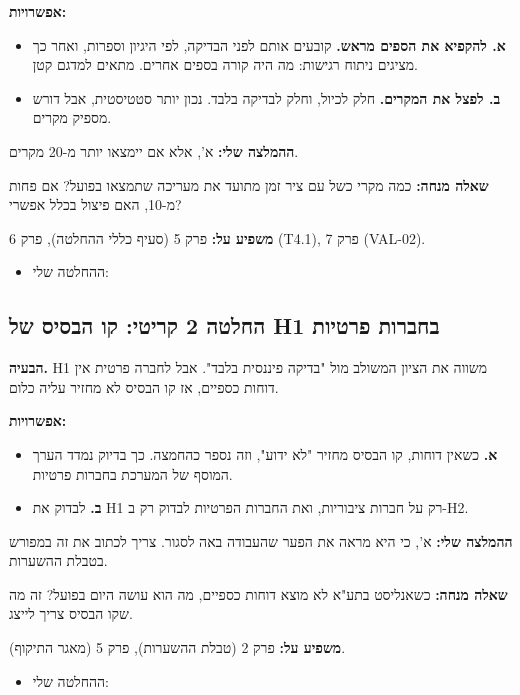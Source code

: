 \documentclass[11pt,a4paper]{article}
\newcommand{\en}[1]{\foreignlanguage{english}{#1}}
\newcommand{\cb}{\framebox[1.7ex]{\rule{0pt}{1.3ex}}}
\newenvironment{checks}{\begin{itemize}\renewcommand{\labelitemi}{\cb}}{\end{itemize}}
\newcommand{\crit}{\textcolor{red!70!black}{\textbf{קריטי}}}
\begin{document}
\textbf{אפשרויות:}
\begin{itemize}
\item \textbf{א. להקפיא את הספים מראש.} קובעים אותם לפני הבדיקה, לפי היגיון וספרות, ואחר כך מציגים ניתוח רגישות: מה היה קורה בספים אחרים. מתאים למדגם קטן.
\item \textbf{ב. לפצל את המקרים.} חלק לכיול, וחלק לבדיקה בלבד. נכון יותר סטטיסטית, אבל דורש מספיק מקרים.
\end{itemize}
\textbf{ההמלצה שלי:} א', אלא אם יימצאו יותר מ-20 מקרים.

\textbf{שאלה מנחה:} כמה מקרי כשל עם ציר זמן מתועד את מעריכה שתמצאו בפועל? אם פחות מ-10, האם פיצול בכלל אפשרי?

\textbf{משפיע על:} פרק 5 (סעיף כללי ההחלטה), פרק 6 (\en{T4.1}), פרק 7 (\en{VAL-02}).

\begin{checks}
\item ההחלטה שלי: \underline{\hspace{8cm}}
\end{checks}

\subsection*{החלטה 2 \crit: קו הבסיס של \en{H1} בחברות פרטיות}
\textbf{הבעיה.} \en{H1} משווה את הציון המשולב מול "בדיקה פיננסית בלבד". אבל לחברה פרטית אין דוחות כספיים, אז קו הבסיס לא מחזיר עליה כלום.

\textbf{אפשרויות:}
\begin{itemize}
\item \textbf{א.} כשאין דוחות, קו הבסיס מחזיר "לא ידוע", וזה נספר כהחמצה. כך בדיוק נמדד הערך המוסף של המערכת בחברות פרטיות.
\item \textbf{ב.} לבדוק את \en{H1} רק על חברות ציבוריות, ואת החברות הפרטיות לבדוק רק ב-\en{H2}.
\end{itemize}
\textbf{ההמלצה שלי:} א', כי היא מראה את הפער שהעבודה באה לסגור. צריך לכתוב את זה במפורש בטבלת ההשערות.

\textbf{שאלה מנחה:} כשאנליסט בתע"א לא מוצא דוחות כספיים, מה הוא עושה היום בפועל? זה מה שקו הבסיס צריך לייצג.

\textbf{משפיע על:} פרק 2 (טבלת ההשערות), פרק 5 (מאגר התיקוף).

\begin{checks}
\item ההחלטה שלי: \underline{\hspace{8cm}}
\end{checks}
\end{document}
